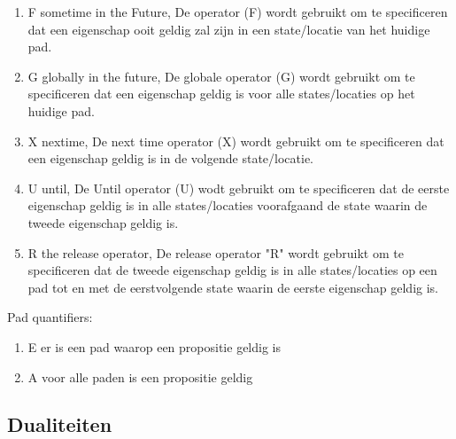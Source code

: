 \documentclass{article}
\begin{document}
		\begin{enumerate}
		\item F sometime in the Future,	De operator (F) wordt gebruikt om te specificeren dat een eigenschap ooit geldig zal zijn in een state/locatie van het huidige pad.
		\item G globally in the future, De globale operator (G) wordt gebruikt om te specificeren dat een eigenschap geldig is voor alle states/locaties op het huidige pad.
		\item X nextime,  De next time operator (X) wordt gebruikt om te specificeren dat een eigenschap geldig is in de volgende state/locatie.
		\item U until,  De Until operator (U) wodt gebruikt om te specificeren dat de eerste eigenschap geldig is in alle states/locaties voorafgaand de state waarin de tweede eigenschap geldig is.
		\item R the release operator,
		De release operator "R" wordt gebruikt om te specificeren dat de tweede eigenschap geldig is in alle states/locaties op een pad tot en met de eerstvolgende state waarin de eerste eigenschap geldig is.
	\end{enumerate}
	Pad  quantifiers: 
	\begin{enumerate}
		\item E er is een pad waarop een propositie geldig is
		\item A voor alle paden is een propositie geldig
	\end{enumerate}
	\subsection{Dualiteiten}
	
	
\end{document}
